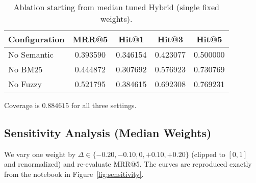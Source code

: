\begin{table}[h]
\centering
\small
\begin{tabular}{l S[table-format=1.6] S[table-format=1.6] S[table-format=1.6] S[table-format=1.6]}
\toprule
\textbf{Configuration} & \textbf{MRR@5} & \textbf{Hit@1} & \textbf{Hit@3} & \textbf{Hit@5} \\
\midrule
No Semantic & 0.393590 & 0.346154 & 0.423077 & 0.500000 \\
No BM25     & 0.444872 & 0.307692 & 0.576923 & 0.730769 \\
No Fuzzy    & 0.521795 & 0.384615 & 0.692308 & 0.769231 \\
\bottomrule
\end{tabular}

\vspace{0.25em}
\small Coverage is $0.884615$ for all three settings.
\caption{Ablation starting from median tuned Hybrid (single fixed weights).}
\label{tab:ablation}
\end{table}

\subsection{Sensitivity Analysis (Median Weights)}
We vary one weight by $\Delta\in\{-0.20,-0.10,0,+0.10,+0.20\}$ (clipped to $[0,1]$ and renormalized) and re-evaluate MRR@5. The curves are reproduced exactly from the notebook in Figure~\ref{fig:sensitivity}.

